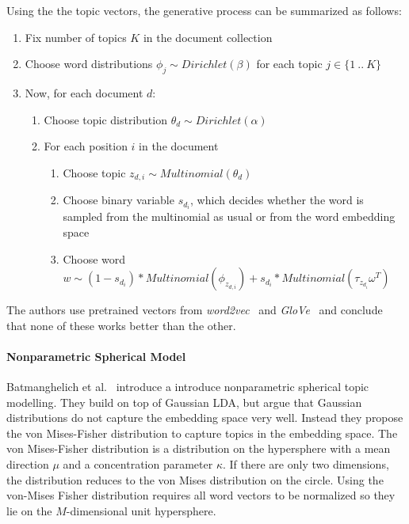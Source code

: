 \documentclass[
        a4paper,
        titlepage,
        twoside,
        parskip
        ]{scrbook}
\theoremstyle{break}
\begin{document}
Using the the topic vectors, the generative process can be summarized as follows:
\begin{enumerate}
    \item Fix number of topics $K$ in the document collection
    \item Choose word distributions $\phi_j \sim Dirichlet(\beta)$ for each topic $j \in \{1~..~K\}$
    \item Now, for each document $d$:
    \begin{enumerate}
        \item Choose topic distribution $\theta_d \sim Dirichlet(\alpha)$
        \item For each position $i$ in the document
        \begin{enumerate}
            \item Choose topic $z_{d,i} \sim Multinomial(\theta_d)$
            \item Choose binary variable $s_{d_i}$, which decides whether the word is sampled from the multinomial as usual or from the word embedding space
            \item Choose word $w \sim (1 - s_{d_i}) * Multinomial(\phi_{z_{d,i}}) + s_{d_i} * Multinomial(\tau_{z_{d_{i}}} \omega^T)$
        \end{enumerate}
    \end{enumerate}
\end{enumerate}
The authors use pretrained vectors from \emph{word2vec}~\cite{Mikolov2013a} and \emph{GloVe}~\cite{Pennington2014} and conclude that none of these works better than the other.

\paragraph{Nonparametric Spherical Model}
Batmanghelich et al.~\cite{Batmanghelich2016} introduce a  introduce nonparametric spherical topic modelling.
They build on top of Gaussian LDA, but argue that Gaussian distributions do not capture the embedding space very well.
Instead they propose the von Mises-Fisher distribution to capture topics in the embedding space.
The von Mises-Fisher distribution is a distribution on the hypersphere with a mean direction $\mu$ and a concentration parameter $\kappa$.
If there are only two dimensions, the distribution reduces to the von Mises distribution on the circle.
Using the von-Mises Fisher distribution requires all word vectors to be normalized so they lie on the $M$-dimensional unit hypersphere.
\end{document}
